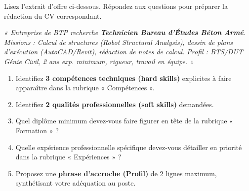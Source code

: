 \documentclass[11pt]{article}
\begin{document}
\begin{exercice}
Lisez l'extrait d'offre ci-dessous. Répondez aux questions pour préparer la rédaction du CV correspondant.

\textit{« Entreprise de BTP recherche \textbf{Technicien Bureau d'Études Béton Armé}. Missions : Calcul de structures (Robot Structural Analysis), dessin de plans d'exécution (AutoCAD/Revit), rédaction de notes de calcul. Profil : BTS/DUT Génie Civil, 2 ans exp. minimum, rigueur, travail en équipe. »}

\begin{enumerate}
    \item Identifiez \textbf{3 compétences techniques (hard skills)} explicites à faire apparaître dans la rubrique « Compétences ».
    \item Identifiez \textbf{2 qualités professionnelles (soft skills)} demandées.
    \item Quel diplôme minimum devez-vous faire figurer en tête de la rubrique « Formation » ?
    \item Quelle expérience professionnelle spécifique devez-vous détailler en priorité dans la rubrique « Expériences » ?
    \item Proposez une \textbf{phrase d'accroche (Profil)} de 2 lignes maximum, synthétisant votre adéquation au poste.
\end{enumerate}
\end{exercice}
\end{document}
